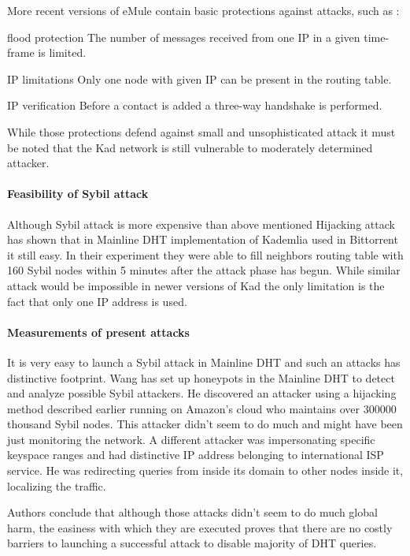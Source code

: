 More recent versions of eMule contain basic protections against attacks, such
as \cite{tim11}:
\begin{description}
  \item{flood protection} The number of messages received from one IP in a given
    time-frame is limited.
  \item{IP limitations} Only one node with given IP can be present in the
    routing table.
  \item{IP verification} Before a contact is added a three-way handshake is
    performed.
\end{description}

While those protections defend against small and unsophisticated attack it must
be noted that the Kad network is still vulnerable to moderately determined
attacker.

\paragraph{Feasibility of Sybil attack}
Although Sybil attack is more expensive than above mentioned Hijacking attack
\cite{tim11} has shown that in Mainline DHT implementation of Kademlia used in
Bittorrent it still easy. In their experiment they were able to fill neighbors
routing table with 160 Sybil nodes within 5 minutes after the attack phase has
begun. While similar attack would be impossible in newer versions of Kad the
only limitation is the fact that only one IP address is used.

\paragraph{Measurements of present attacks}
It is very easy to launch a Sybil attack in Mainline DHT and such an attacks has
distinctive footprint. Wang \cite{Wan12} has set up honeypots in the Mainline
DHT to detect and analyze possible Sybil attackers. He discovered an attacker
using a hijacking method described earlier running on Amazon's cloud who
maintains over 300000 thousand Sybil nodes. This attacker didn't seem to do much
and might have been just monitoring the network. A different attacker was
impersonating specific keyspace ranges and had distinctive IP address belonging
to international ISP service. He was redirecting queries from inside its domain
to other nodes inside it, localizing the traffic.

Authors conclude that although those attacks didn't seem to do much global harm,
the easiness with which they are executed proves that there are no costly
barriers to launching a successful attack to disable majority of DHT queries.
